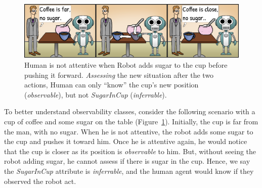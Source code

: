 \documentclass[letterpaper]{article} %
\begin{document}
\begin{figure}
    \centering
    \includegraphics[width=0.9\linewidth]{figures/cartoon_inf_obs_bigger.png}
    \caption{
    Human is not attentive when Robot adds sugar to the cup before pushing it forward. \textit{Assessing} the new situation after the two actions, Human can only ``know'' the cup's new position (\textit{observable}), but not \textit{SugarInCup} (\textit{inferrable}).
    }
    \label{fig:obs_attr}
\end{figure}


To better understand observability classes, consider the following scenario with a cup of coffee and some sugar on the table (Figure~\ref{fig:obs_attr}). 
Initially, the cup is far from the man, with no sugar. When he is not attentive, the robot adds some sugar to the cup and pushes it toward him. 
Once he is attentive again, he would notice that the cup is closer as its position is \textit{observable} to him.
But, without seeing the robot adding sugar, he cannot assess if there is sugar in the cup. Hence, we say the \textit{SugarInCup} attribute is \textit{inferrable}, 
and the human agent would know if they observed the robot act.

\end{document}
